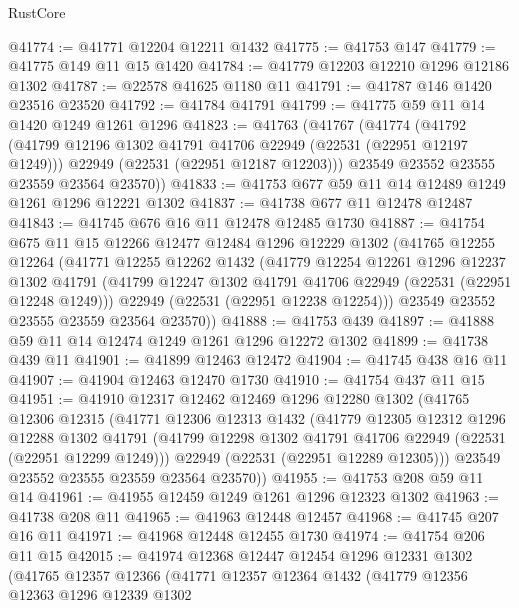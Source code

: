 \begin{lexlean}{RustCore}
\begin{coremodule}
@41774 := @41771 @12204 @12211 @1432
@41775 := @41753 @147
@41779 := @41775 @149 @11 @15 @1420
@41784 := @41779 @12203 @12210 @1296 @12186 @1302
@41787 := @22578 @41625 @1180 @11
@41791 := @41787 @146 @1420 @23516 @23520
@41792 := @41784 @41791
@41799 := @41775 @59 @11 @14 @1420 @1249 @1261 @1296
@41823 := @41763
    (@41767
      (@41774
        (@41792
          (@41799 @12196 @1302 @41791 @41706 @22949 (@22531 (@22951 @12197 @1249)))
          @22949
          (@22531 (@22951 @12187 @12203)))
        @23549
        @23552
        @23555
        @23559
        @23564
        @23570))
@41833 := @41753 @677 @59 @11 @14 @12489 @1249 @1261 @1296 @12221 @1302
@41837 := @41738 @677 @11 @12478 @12487
@41843 := @41745 @676 @16 @11 @12478 @12485 @1730
@41887 := @41754
    @675
    @11
    @15
    @12266
    @12477
    @12484
    @1296
    @12229
    @1302
    (@41765
      @12255
      @12264
      (@41771
        @12255
        @12262
        @1432
        (@41779
          @12254
          @12261
          @1296
          @12237
          @1302
          @41791
          (@41799 @12247 @1302 @41791 @41706 @22949 (@22531 (@22951 @12248 @1249)))
          @22949
          (@22531 (@22951 @12238 @12254)))
        @23549
        @23552
        @23555
        @23559
        @23564
        @23570))
@41888 := @41753 @439
@41897 := @41888 @59 @11 @14 @12474 @1249 @1261 @1296 @12272 @1302
@41899 := @41738 @439 @11
@41901 := @41899 @12463 @12472
@41904 := @41745 @438 @16 @11
@41907 := @41904 @12463 @12470 @1730
@41910 := @41754 @437 @11 @15
@41951 := @41910
    @12317
    @12462
    @12469
    @1296
    @12280
    @1302
    (@41765
      @12306
      @12315
      (@41771
        @12306
        @12313
        @1432
        (@41779
          @12305
          @12312
          @1296
          @12288
          @1302
          @41791
          (@41799 @12298 @1302 @41791 @41706 @22949 (@22531 (@22951 @12299 @1249)))
          @22949
          (@22531 (@22951 @12289 @12305)))
        @23549
        @23552
        @23555
        @23559
        @23564
        @23570))
@41955 := @41753 @208 @59 @11 @14
@41961 := @41955 @12459 @1249 @1261 @1296 @12323 @1302
@41963 := @41738 @208 @11
@41965 := @41963 @12448 @12457
@41968 := @41745 @207 @16 @11
@41971 := @41968 @12448 @12455 @1730
@41974 := @41754 @206 @11 @15
@42015 := @41974
    @12368
    @12447
    @12454
    @1296
    @12331
    @1302
    (@41765
      @12357
      @12366
      (@41771
        @12357
        @12364
        @1432
        (@41779
          @12356
          @12363
          @1296
          @12339
          @1302

\end{coremodule}
\end{lexlean}
